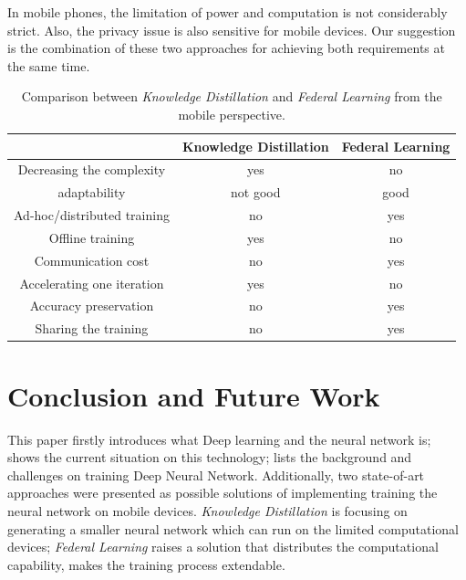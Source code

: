 \documentclass[article]{aaltoseries}
\begin{document}
In mobile phones, the limitation of power and computation is not considerably strict. 
Also, the privacy issue is also sensitive for mobile devices. Our suggestion is the combination
of these two approaches for achieving both requirements at the same time.



\begin{table}
  
\begin{center}
  \begin{tabular}{ |c|c|c| } 
   \hline
                                               & Knowledge Distillation & Federal Learning \\ 
   \hline
   Decreasing the complexity                   & yes                    & no \\ 
   \hline
   adaptability                                & not good               & good \\ 
   \hline
   Ad-hoc/distributed training                 & no                     & yes \\ 
   \hline
   Offline training                            & yes                    & no \\ 
   \hline
   Communication cost                          & no                     & yes \\ 
   \hline
   Accelerating one iteration                  & yes                    & no \\ 
   \hline
   Accuracy preservation                       & no                     & yes \\ 
   \hline
   Sharing the training                        & no                     & yes \\ 
   \hline
  \end{tabular}
\end{center}

  \caption{Comparison between \emph{Knowledge Distillation} and \emph{Federal Learning} from the mobile perspective.}
\label{table:comparing}
\end{table}




\section{Conclusion and Future Work}
\label{sec:conclusion}

This paper firstly introduces what Deep learning and the neural network is; shows the current situation on this technology;
lists the background and challenges on training Deep Neural Network. Additionally, two state-of-art approaches were 
presented as possible solutions of implementing training the neural network on mobile devices. \emph{Knowledge Distillation} 
is focusing on generating a smaller neural network which can run on the limited computational devices; 
\emph{Federal Learning} raises a solution that distributes the computational capability, makes the training process
extendable. 
\end{document}

